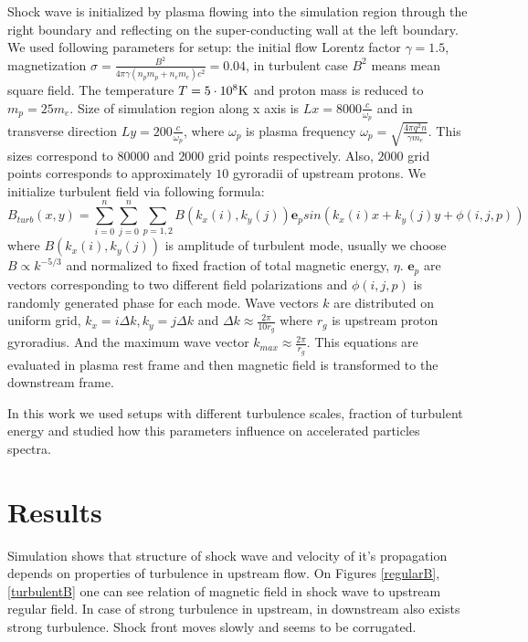 \documentclass[a4paper]{jpconf}
\begin{document}
Shock wave is initialized by plasma flowing into the simulation region through the right boundary and reflecting on the super-conducting wall at the left boundary. We used following parameters for setup: the initial flow Lorentz factor $\gamma = 1.5$, magnetization $\sigma = \frac{B^2}{4\pi\gamma (n_p m_p + n_e m_e) c^2} = 0.04$, in turbulent case $B^2$ means mean square field. The temperature $T = 5\cdot10^8 \rm{K}$ and proton mass is reduced to $m_p = 25 m_e$. Size of simulation region along x axis is $Lx = 8000\frac{c}{\omega_p}$ and in transverse direction $Ly = 200\frac{c}{\omega_p}$, where $\omega_p$ is plasma frequency $\omega_p = \sqrt{\frac{4\pi q^2 n}{\gamma m_e}}$. This sizes correspond to $80000$ and $2000$ grid points respectively. Also, $2000$ grid points corresponds to approximately $10$ gyroradii of upstream protons.
We initialize turbulent field via following formula: 
\begin{equation}
B_{turb} (x,y) = \sum_{i=0}^{n}\sum_{j=0}^{n}\sum_{p=1,2}B(k_x(i),k_y(j)) \textbf{e}_{p} sin(k_x(i) x + k_y(j) y  + \phi (i,j,p))
\end{equation}
where $B(k_x(i),k_y(j))$ is amplitude of turbulent mode, usually we choose $B \propto k^{-5/3}$ and normalized to fixed fraction of total magnetic energy, $\eta$. $\textbf{e}_{p}$ are vectors corresponding to two different field polarizations and $\phi (i,j,p)$ is randomly generated phase for each mode. Wave vectors $k$ are distributed on uniform grid, $k_x = i \Delta k, k_y = j \Delta k$ and $\Delta k \approx \frac{2 \pi}{10 r_g}$ where $r_g$ is upstream proton gyroradius. And the maximum wave vector $k_{max} \approx \frac{2 \pi}{r_g}$. This equations are evaluated in plasma rest frame and then magnetic field is transformed to the downstream frame.

In this work we used setups with different turbulence scales, fraction of turbulent energy  and studied how this parameters influence on accelerated particles spectra.
\section{Results}


Simulation shows that structure of shock wave and velocity of it's propagation depends on properties of turbulence in upstream flow. On Figures \ref{regularB}, \ref{turbulentB} one can see relation of magnetic field in shock wave to upstream regular field. In case of strong turbulence in upstream, in downstream also exists strong turbulence. Shock front moves slowly and seems to be corrugated.
\end{document}
